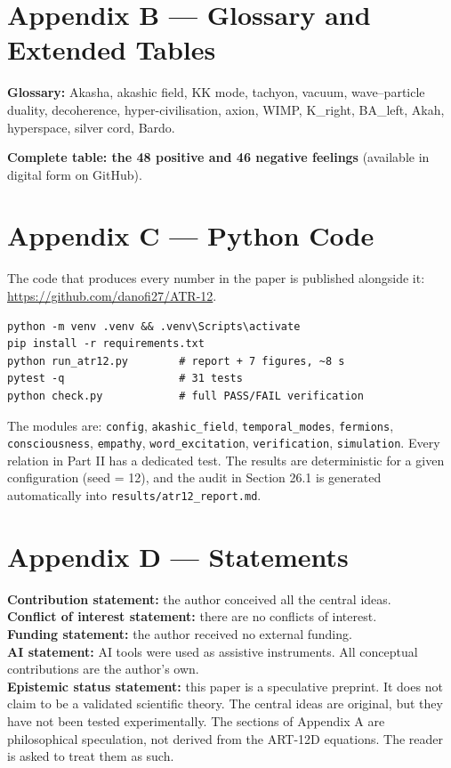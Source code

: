 \documentclass[11pt,a4paper]{article}
\begin{document}
\section{Appendix B --- Glossary and Extended Tables}
\textbf{Glossary:} Akasha, akashic field, KK mode, tachyon, vacuum, wave--particle duality, decoherence, hyper-civilisation, axion, WIMP, K\_right, BA\_left, Akah, hyperspace, silver cord, Bardo.

\textbf{Complete table: the 48 positive and 46 negative feelings} (available in digital form on GitHub).

\section{Appendix C --- Python Code}
The code that produces every number in the paper is published alongside it: \url{https://github.com/danofi27/ATR-12}.

\begin{verbatim}
python -m venv .venv && .venv\Scripts\activate
pip install -r requirements.txt
python run_atr12.py        # report + 7 figures, ~8 s
pytest -q                  # 31 tests
python check.py            # full PASS/FAIL verification
\end{verbatim}

The modules are: \texttt{config}, \texttt{akashic\_field}, \texttt{temporal\_modes}, \texttt{fermions}, \texttt{consciousness}, \texttt{empathy}, \texttt{word\_excitation}, \texttt{verification}, \texttt{simulation}. Every relation in Part II has a dedicated test. The results are deterministic for a given configuration (seed = 12), and the audit in Section 26.1 is generated automatically into \texttt{results/atr12\_report.md}.

\section{Appendix D --- Statements}
\textbf{Contribution statement:} the author conceived all the central ideas. \\
\textbf{Conflict of interest statement:} there are no conflicts of interest. \\
\textbf{Funding statement:} the author received no external funding. \\
\textbf{AI statement:} AI tools were used as assistive instruments. All conceptual contributions are the author's own. \\
\textbf{Epistemic status statement:} this paper is a speculative preprint. It does not claim to be a validated scientific theory. The central ideas are original, but they have not been tested experimentally. The sections of Appendix A are philosophical speculation, not derived from the ART-12D equations. The reader is asked to treat them as such.
\end{document}
